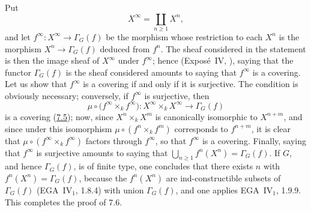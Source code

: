 Put
\[
  X^\infty=\coprod_{n\geq1}X^n,
\]
and let \(f^\infty:X^\infty\to\Gamma_G(f)\) be the morphism
whose restriction to each \(X^n\) is the morphism
\(X^n\to\Gamma_G(f)\) deduced from \(f^n\). The sheaf considered
in the statement is then the image sheaf of \(X^\infty\) under
\(f^\infty\); hence (Exposé~IV,
), saying that the
functor \(\Gamma_G(f)\) is the sheaf considered amounts to saying
that \(f^\infty\) is a covering. Let us show that \(f^\infty\) is
a covering if and only if it is surjective. The condition is
obviously necessary; conversely, if \(f^\infty\) is surjective,
then
\label{form:sga3-VIB-7.6-finfty-product}%
\[
  \mu\circ
  \bigl(f^\infty\times_k f^\infty\bigr):
  X^\infty\times_k X^\infty\longrightarrow\Gamma_G(f)
\]
is a covering (\hyperref[lem:sga3-VIB-7.5]{7.5}); now, since
\(X^n\times_kX^m\) is canonically isomorphic to \(X^{n+m}\), and
since under this isomorphism \(\mu\circ(f^n\times_kf^m)\)
corresponds to \(f^{n+m}\), it is clear that
\(\mu\circ(f^\infty\times_kf^\infty)\) factors through
\(f^\infty\), so that \(f^\infty\) is a covering. Finally, saying
that \(f^\infty\) is surjective amounts to saying that
\(\bigcup_{n\geq1}f^n(X^n)=\Gamma_G(f)\). If \(G\), and hence
\(\Gamma_G(f)\), is of finite type, one concludes that there
exists \(n\) with \(f^n(X^n)=\Gamma_G(f)\), because the
\(f^n(X^n)\) are ind-constructible subsets of \(\Gamma_G(f)\)
(EGA~IV\(_1\), 1.8.4) with union \(\Gamma_G(f)\), and one applies
EGA~IV\(_1\), 1.9.9. This completes the proof of 7.6.


